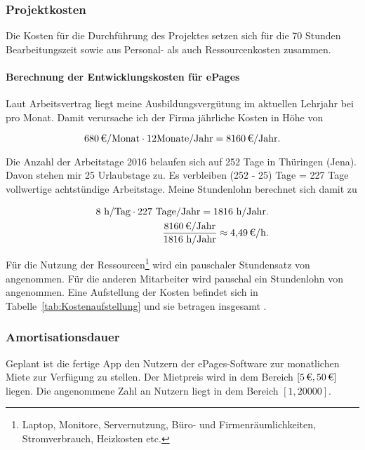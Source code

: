 \subsubsection{Projektkosten}
\label{sec:Projektkosten}

Die Kosten für die Durchführung des Projektes setzen sich für die 70 Stunden Bearbeitungszeit sowie aus Personal- als auch Ressourcenkosten zusammen.

\paragraph{Berechnung der Entwicklungskosten für ePages}
Laut Arbeitsvertrag liegt meine Ausbildungsvergütung im aktuellen Lehrjahr bei  pro Monat. Damit verursache ich der Firma jährliche Kosten in Höhe von 

\begin{equation}
	\eur{680}/\mbox{Monat} \cdot 12 \mbox{Monate/Jahr} = \eur{8160}/\mbox{Jahr}.
\end{equation}

Die Anzahl der Arbeitstage 2016 belaufen sich auf 252 Tage in Thüringen (Jena). Davon stehen mir 25 Urlaubstage zu. Es verbleiben (252 - 25) Tage = 227 Tage vollwertige  achtstündige Arbeitstage. Meine Stundenlohn berechnet sich damit zu

\begin{eqnarray}
	8 \mbox{ h/Tag} \cdot 227 \mbox{ Tage/Jahr} = 1816 \mbox{ h/Jahr} .\\
	\frac{\eur{8160} \mbox{/Jahr}}{1816 \mbox{ h/Jahr}} \approx \eur{4,49}\mbox{/h}.
\end{eqnarray}

Für die Nutzung der Ressourcen\footnote{Laptop, Monitore, Servernutzung, Büro- und Firmenräumlichkeiten, Stromverbrauch, Heizkosten etc.} wird ein pauschaler Stundensatz von  angenommen. Für die anderen Mitarbeiter wird pauschal ein Stundenlohn von  angenommen. Eine Aufstellung der Kosten befindet sich in Tabelle~\ref{tab:Kostenaufstellung} und sie betragen insgesamt .

\subsubsection{Amortisationsdauer}
\label{sec:Amortisationsdauer}

Geplant ist die fertige App den Nutzern der ePages-Software zur monatlichen Miete zur Verfügung zu stellen. Der Mietpreis wird in dem Bereich $[\mbox{\eur{5}},\mbox{\eur{50}}]$ liegen. Die angenommene Zahl an Nutzern liegt in dem Bereich $[\mbox{1},\mbox{20000}]$.

